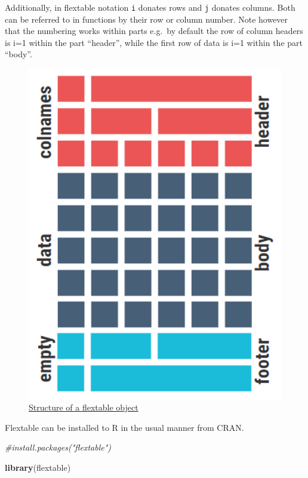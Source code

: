 \documentclass[
]{book}
\newenvironment{Shaded}{\begin{snugshade}}{\end{snugshade}}
\newcommand{\CommentTok}[1]{\textcolor[rgb]{0.56,0.35,0.01}{\textit{#1}}}
\newcommand{\KeywordTok}[1]{\textcolor[rgb]{0.13,0.29,0.53}{\textbf{#1}}}
\newcommand{\NormalTok}[1]{#1}
\begin{document}
Additionally, in flextable notation \texttt{i} donates rows and \texttt{j} donates columns. Both can be referred to in functions by their row or column number. Note however that the numbering works within parts e.g.~by default the row of column headers is i=1 within the part ``header'', while the first row of data is i=1 within the part ``body''.



\begin{figure}

{\centering \includegraphics[width=5.18in]{img/flextable_object} 

}

\caption{\href{https://ardata-fr.github.io/flextable-book/design.html\#table-parts}{Structure of a flextable object}}\label{fig:unnamed-chunk-2}
\end{figure}

Flextable can be installed to R in the usual manner from CRAN.

\begin{Shaded}
\begin{Highlighting}[]
\CommentTok{#install.packages("flextable")}

\KeywordTok{library}\NormalTok{(flextable)}
\end{Highlighting}
\end{Shaded}
\end{document}
